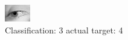 \begin{figure}[h!]
\begin{center}
\includegraphics[width=0.60\columnwidth]{figures/ID3036_class_3_target_4.png}
\end{center}
\caption{ Classification: 3 actual target: 4}
\label{fig:ID3036_class_3_target_4}
\end{figure}

